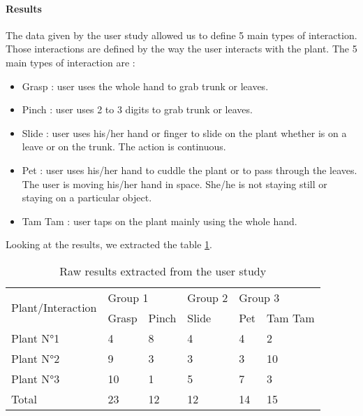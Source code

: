\paragraph{Results}

The data given by the user study allowed us to define 5 main types of interaction. Those interactions are defined by the way the user interacts with the plant. The 5 main types of interaction are :

\begin{itemize}
    \item Grasp : user uses the whole hand to grab trunk or leaves.
    \item Pinch : user uses 2 to 3 digits to grab trunk or leaves.
    \item Slide : user uses his/her hand or finger to slide on the plant whether is on a leave or on the trunk. The action is continuous.
    \item Pet : user uses his/her hand to cuddle the plant or to pass through the leaves. The user is moving his/her hand in space. She/he is not staying still or staying on a particular object.
    \item Tam Tam : user taps on the plant mainly using the whole hand.
\end{itemize}



Looking at the results, we extracted the table \ref{tab:results}.


\begin{table}[ht]
\begin{tabular}{|l|ll|l|ll|}
\hline
\multirow{2}{*}{Plant/Interaction} & \multicolumn{2}{l|}{Group 1}       & Group 2 & \multicolumn{2}{l|}{Group 3}       \\ \cline{2-6} 
                                   & \multicolumn{1}{l|}{Grasp} & Pinch & Slide   & \multicolumn{1}{l|}{Pet} & Tam Tam \\ \hline
Plant N°1                          & \multicolumn{1}{l|}{4}     & 8     & 4       & \multicolumn{1}{l|}{4}   & 2       \\ \hline
Plant N°2                          & \multicolumn{1}{l|}{9}     & 3     & 3       & \multicolumn{1}{l|}{3}   & 10      \\ \hline
Plant N°3                          & \multicolumn{1}{l|}{10}    & 1     & 5       & \multicolumn{1}{l|}{7}   & 3       \\ \hline
Total                              & \multicolumn{1}{l|}{23}    & 12    & 12      & \multicolumn{1}{l|}{14}  & 15      \\ \hline
\end{tabular}
\caption{Raw results extracted from the user study}
\label{tab:results}
\end{table}


